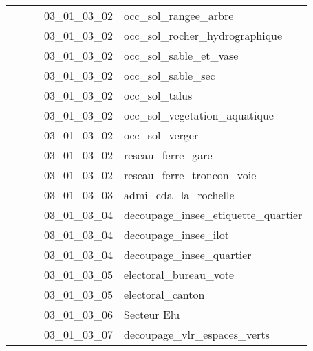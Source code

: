 \documentclass[12pt,titlepage,oneside]{book}
\begin{document}
\begin{supertabular}{|p{7.5cm}|p{7.5cm}|p{7.5cm}|c|p{10cm}|}
                   &                    &                    & 03\_01\_03\_02 & occ\_sol\_rangee\_arbre\\
                   &                    &                    & 03\_01\_03\_02 & occ\_sol\_rocher\_hydrographique\\
                   &                    &                    & 03\_01\_03\_02 & occ\_sol\_sable\_et\_vase\\
                   &                    &                    & 03\_01\_03\_02 & occ\_sol\_sable\_sec\\
                   &                    &                    & 03\_01\_03\_02 & occ\_sol\_talus\\
                   &                    &                    & 03\_01\_03\_02 & occ\_sol\_vegetation\_aquatique\\
                   &                    &                    & 03\_01\_03\_02 & occ\_sol\_verger\\
                   &                    &                    & 03\_01\_03\_02 & reseau\_ferre\_gare\\
                   &                    &                    & 03\_01\_03\_02 & reseau\_ferre\_troncon\_voie\\
                   &                    &                    & 03\_01\_03\_03 & admi\_cda\_la\_rochelle\\
                   &                    &                    & 03\_01\_03\_04 & decoupage\_insee\_etiquette\_quartier\\
                   &                    &                    & 03\_01\_03\_04 & decoupage\_insee\_ilot\\
                   &                    &                    & 03\_01\_03\_04 & decoupage\_insee\_quartier\\
                   &                    &                    & 03\_01\_03\_05 & electoral\_bureau\_vote\\
                   &                    &                    & 03\_01\_03\_05 & electoral\_canton\\
                   &                    &                    & 03\_01\_03\_06 & Secteur Elu\\
                   &                    &                    & 03\_01\_03\_07 & decoupage\_vlr\_espaces\_verts\\

\end{supertabular}
\end{document}
